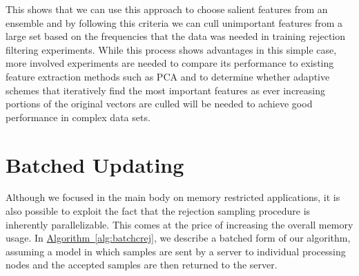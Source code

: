 \documentclass{article} %
\newcommand{\alg}[1]{\hyperref[alg:#1]{Algorithm~\ref*{alg:#1}}}
\begin{document}
This shows that we can use this approach to choose salient features from an ensemble and by following this criteria we can cull unimportant features from a large set based on the frequencies that the data was needed in training rejection filtering experiments.  While this process shows advantages in this simple case, more involved experiments are needed to compare its performance to existing feature extraction methods such as PCA and to determine whether adaptive schemes that iteratively find the most important features as ever increasing portions of the original vectors are culled will be needed to achieve good performance in complex data sets.


\section{Batched Updating}
\label{app:batched-updates}

Although we focused in the main body on memory restricted applications, it is also possible to exploit the fact that the
rejection sampling procedure is inherently parallelizable.
This comes at the price of increasing the overall
memory usage. In \alg{batchcrej}, we describe a batched form of our algorithm, assuming a model in which samples are sent by a server to individual processing nodes and the accepted samples are then returned to the server.
\end{document}

